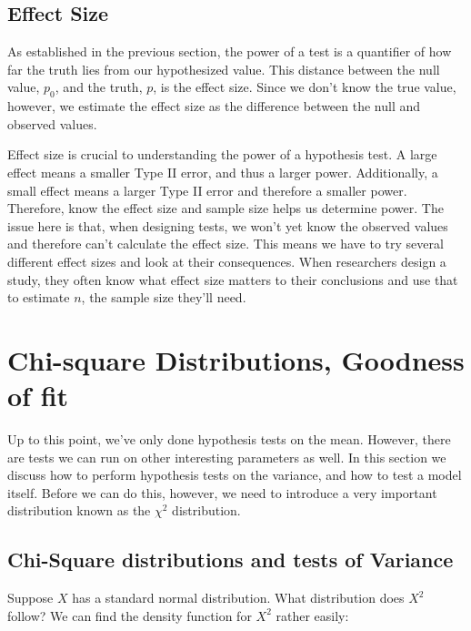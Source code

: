 \subsection{Effect Size} \label{sec:Effect Size}

As established in the previous section, the power of a test is a quantifier of how far the truth lies from our hypothesized value. This distance between the null value, $p_0$, and the truth, $p$, is the effect size. Since we don't know the true value, however, we estimate the effect size as the difference between the null and observed values.

Effect size is crucial to understanding the power of a hypothesis test. A large effect means a smaller Type II error, and thus a larger power. Additionally, a small effect means a larger Type II error and therefore a smaller power. Therefore, know the effect size and sample size helps us determine power. The issue here is that, when designing tests, we won't yet know the observed values and therefore can't calculate the effect size. This means we have to try several different effect sizes and look at their consequences. When researchers design a study, they often know what effect size matters to their conclusions and use that to estimate $n$, the sample size they'll need.

\section{Chi-square Distributions, Goodness of fit} \label{sec:ChiSquare}

Up to this point, we've only done hypothesis tests on the mean.  However, there are tests we can run on other interesting parameters as well.  In this section we discuss how to perform hypothesis tests on the variance, and how to test a model itself.  Before we can do this, however, we need to introduce a very important distribution known as the $\chi^2$ distribution.


\subsection{Chi-Square distributions and tests of Variance}

Suppose $X$ has a standard normal distribution.  What distribution does $X^2$ follow?  We can find the density function for $X^2$ rather easily:

